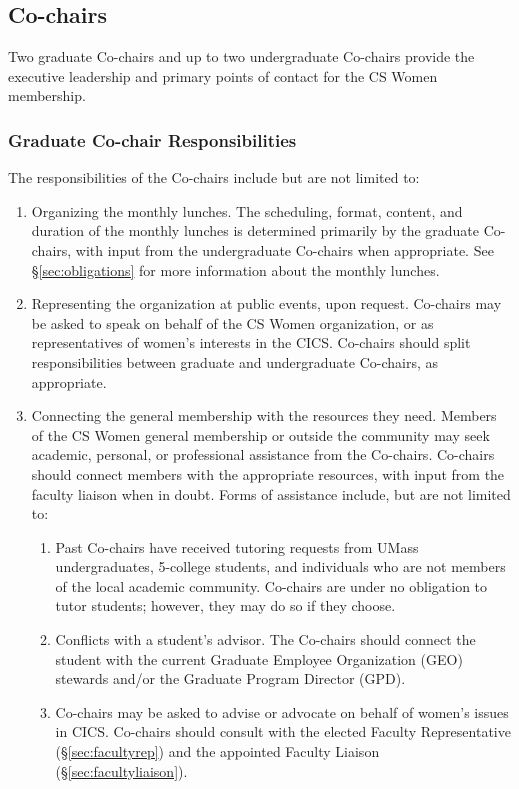 \subsection{Co-chairs}
\label{sec:cochairs}
Two graduate Co-chairs and up to two undergraduate Co-chairs provide the executive leadership and primary points of contact for the CS Women membership.

\subsubsection{Graduate Co-chair Responsibilities}
\label{sec:cochairs_responsibilities}
The responsibilities of the Co-chairs include but are not limited to:
\begin{enumerate}
	\item\label{item:lunch} Organizing the monthly lunches. The scheduling, format, content, and duration of the monthly lunches is determined primarily by the graduate Co-chairs, with input from the undergraduate Co-chairs when appropriate. See \S\ref{sec:obligations} for more information about the monthly lunches.
	\item\label{item:representation} Representing the organization at public events, upon request. Co-chairs may be asked to speak on behalf of the CS Women organization, or as representatives of women's interests in the CICS. Co-chairs should split responsibilities between graduate and undergraduate Co-chairs, as appropriate. 
	\item\label{item:connection} Connecting the general membership with the resources they need. Members of the CS Women general membership or outside the community may seek academic, personal, or professional assistance from the Co-chairs. Co-chairs should connect members with the appropriate resources, with input from the faculty liaison when in doubt. Forms of assistance include, but are not limited to:
	\begin{enumerate}
	\item\label{item:tutoring} Past Co-chairs have received tutoring requests from UMass undergraduates, 5-college students, and individuals who are not members of the local academic community. Co-chairs are under no obligation to tutor students; however, they may do so if they choose. 
	\item\label{item:geo} Conflicts with a student's advisor. The Co-chairs should connect the student with the current Graduate Employee Organization (GEO) stewards and/or the Graduate Program Director (GPD).
	\item\label{item:womens} Co-chairs may be asked to advise or advocate on behalf of women's issues in CICS. Co-chairs should consult with the elected Faculty Representative (\S\ref{sec:facultyrep}) and the appointed Faculty Liaison (\S\ref{sec:facultyliaison}).

\end{enumerate}
\end{enumerate}
